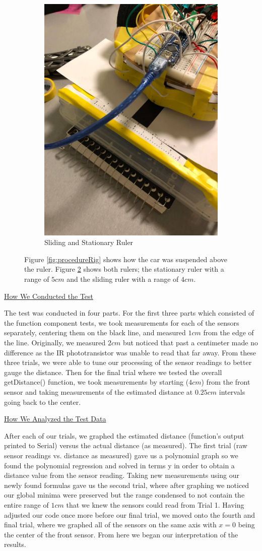 \documentclass[twocolumn]{article}
\newcommand{\rpm}{\raisebox{.2ex}{$\scriptstyle\pm$}}
\newcommand{\subsectionTitle}[1]{ {\hspace{2em}\uline{#1}} \\ \vspace{1em} }
\newcommand{\textTestConduction}{The test was conducted in four parts. For the first three parts which consisted of the function component tests, we took measurements for each of the sensors separately, centering them on the black line, and measured \rpm$1cm$ from the edge of the line. Originally, we measured \rpm$2cm$ but noticed that past a centimeter made no difference as the IR phototransistor was unable to read that far away. From these three trials, we were able to tune our processing of the sensor readings to better gauge the distance. Then for the final trial where we tested the overall getDistance() function, we took measurements by starting (\rpm$4cm$) from the front sensor and taking measurements of the estimated distance at $0.25cm$ intervals going back to the center.
}
\newcommand{\textTestAnalysis}{After each of our trials, we graphed the estimated distance (function’s output printed to Serial) versus the actual distance (as measured). The first trial (raw sensor readings vs. distance as measured) gave us a polynomial graph so we found the polynomial regression and solved in terms y in order to obtain a distance value from the sensor reading. Taking new measurements using our newly found formulas gave us the second trial, where after graphing we noticed our global minima were preserved but the range condensed to not contain the entire range of \rpm$1cm$ that we knew the sensors could read from Trial 1. Having adjusted our code once more before our final trial, we moved onto the fourth and final trial, where we graphed all of the sensors on the same axis with $x=0$ being the center of the front sensor. From here we began our interpretation of the results.
}
\begin{document}
\begin{flushleft}
\begin{figure}[H]
{\begin{subfigure}[b]{0.45\textwidth}
					\includegraphics[width=1\columnwidth, keepaspectratio]{TestProcedure_Ruler.jpg}
					\caption{Sliding and Stationary Ruler}
					\label{fig:procedureRuler}
				\end{subfigure}
				
				\caption{Figure \ref{fig:procedureRig} shows how the car was suspended above the ruler. Figure \ref{fig:procedureRuler} shows both rulers; the stationary ruler with a range of \rpm$5cm$ and the sliding ruler with a range of \rpm$4cm$.}
			}
		\end{figure}
		
		\subsectionTitle{How We Conducted the Test}

		\textTestConduction \\ \vspace{1em}
		
		\subsectionTitle{How We Analyzed the Test Data}

		\textTestAnalysis \\ \vspace{1em}
		

\end{flushleft}
\end{document}
